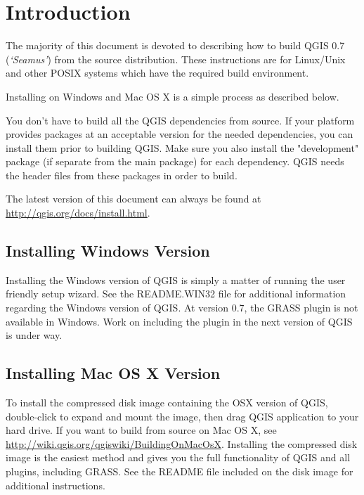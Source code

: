 \section{Introduction}\label{label_introduction}
The majority of this document is devoted to describing how to build QGIS 0.7
(\textit{`Seamus'}) from the source distribution. These instructions are for
Linux/Unix and other POSIX systems which have the required build
environment.

Installing on Windows and Mac OS X is a simple process as described
below.

You don't have to build all the QGIS dependencies from source. If your
platform provides packages at an acceptable version for the needed
dependencies, you can install them prior to building QGIS. Make sure you
also install the "development" package (if separate from the main package)
for each dependency. QGIS needs the header files from these packages in
order to build. 

The latest version of this document can always be found at
\url{http://qgis.org/docs/install.html}.
\subsection{Installing Windows Version}
Installing the Windows version of QGIS is simply a matter of running the
user friendly setup wizard. See the README.WIN32 file for additional
information regarding the Windows version of QGIS. At version 0.7, the GRASS
plugin is not available in Windows. Work on including the plugin in the next
version of QGIS is under way.


\subsection{Installing Mac OS X Version}
To install the compressed disk image containing the OSX version of QGIS,
double-click to expand and mount the image, then drag QGIS application to
your hard drive. If you want to build from source on Mac OS X, see
\url{http://wiki.qgis.org/qgiswiki/BuildingOnMacOsX}. Installing the
compressed disk image is the easiest method and gives you the full
functionality of QGIS and all plugins, including GRASS. See the README file
included on the disk image for additional instructions.


